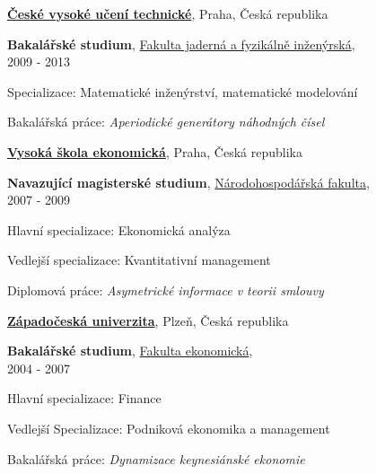 \documentclass[10pt]{article}
\newenvironment{outerlist}[0]%
        {\begin{itemize}}
	{\end{itemize}
         \vspace{-.6\baselineskip}}
\newenvironment{innerlist}[0]%
        {\begin{compactitem}}
	{\end{compactitem}}
\newcommand{\blankline}{\quad\pagebreak[2]}
\begin{document}
\blankline

\href{http://cvut.cz/}{\textbf{České vysoké učení technické}},
Praha, Česká republika

\begin{outerlist}
  
  \item[] \textbf{Bakalářské studium},
	  \href{http://www.fjfi.cvut.cz}
	      {Fakulta jaderná a fyzikálně inženýrská},\\
	      2009 - 2013
	  \begin{innerlist}
	    \item Specializace: Matematické inženýrství, matematické modelování
	    \item Bakalářská práce: \emph{Aperiodické generátory náhodných čísel} 
	  \end{innerlist}
\end{outerlist}

\blankline

\href{http://www.vse.cz/}{\textbf{Vysoká škola ekonomická}},
Praha, Česká republika
\begin{outerlist}
  
  \item[] \textbf{Navazující magisterské studium},
	  \href{http://nf.vse.cz/}
	      {Národohospodářská fakulta},\\
	      2007 - 2009
	  \begin{innerlist}
	    \item Hlavní specializace: Ekonomická analýza
	    \item Vedlejší specializace: Kvantitativní management 
	    \item Diplomová práce: \emph{Asymetrické informace v teorii smlouvy} 
	  \end{innerlist}
\end{outerlist}

\blankline

\href{http://www.zcu.cz//}{\textbf{Západočeská univerzita}},
Plzeň, Česká republika
\begin{outerlist}
  
  \item[] \textbf{Bakalářské studium},
	  \href{http://fek.zcu.cz/}
	      {Fakulta ekonomická},\\
	      2004 - 2007
	  \begin{innerlist}
	    \item Hlavní specializace: Finance
	    \item Vedlejší Specializace: Podniková ekonomika a management
	    \item Bakalářská práce: \emph{Dynamizace keynesiánské ekonomie} 
	  \end{innerlist}
\end{outerlist}
\end{document}
